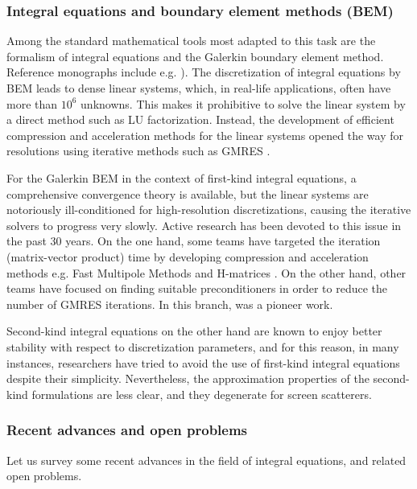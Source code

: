 \documentclass[]{article}
\begin{document}
\subsubsection*{Integral equations and boundary element methods (BEM)}

Among the standard mathematical tools most adapted to this task are the formalism of integral equations and the Galerkin boundary element method. Reference monographs include e.g. \cite{mclean2000strongly,sauter2010boundary}). The discretization of integral equations by BEM leads to dense linear systems, which, in real-life applications, often have more than $10^6$ unknowns. This makes it prohibitive to solve the linear system by a direct method such as LU factorization. Instead, the development of efficient compression and acceleration methods for the linear systems opened the way for resolutions using iterative methods such as GMRES \cite{saad1986gmres}.

For the Galerkin BEM in the context of 	first-kind integral equations, a comprehensive convergence theory is available, but the linear systems are notoriously ill-conditioned for high-resolution discretizations, causing the iterative solvers to progress very slowly. Active research has been devoted to this issue in the past 30 years. On the one hand, some teams have targeted the iteration (matrix-vector product) time by developing compression and acceleration methods e.g. Fast Multipole Methods \cite{greengard1987fast} and H-matrices \cite{hackbusch1999sparse}. On the other hand, other teams have focused on finding suitable preconditioners in order to reduce the number of GMRES iterations. In this branch, \cite{steinbach1998construction} was a pioneer work. 

Second-kind integral equations on the other hand are known to enjoy better stability with respect to discretization parameters, and for this reason, in many instances, researchers have tried to avoid the use of first-kind integral equations despite their simplicity. Nevertheless, the approximation properties of the second-kind formulations are less clear, and they degenerate for screen scatterers. 


\subsubsection*{Recent advances and open problems}

Let us survey some recent advances in the field of integral equations, and related open problems.
\end{document}
